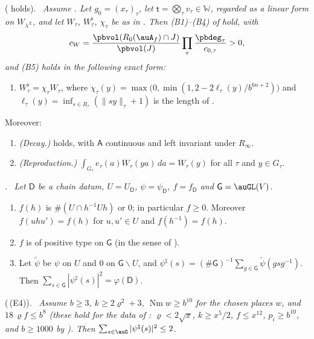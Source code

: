 \documentclass[10pt]{amsart}
\theoremstyle{definition}
\theoremstyle{remark}
\providecommand{\auNm}{\operatorname{Nm}}
\providecommand{\pbW}{\mathbb W}
\providecommand{\pbel}{\ell}
\providecommand{\pbmD}{\mathsf D}
\providecommand{\pbmPhi}{\varphi}
\providecommand{\pbnat}{\natural}
\newenvironment{quotedthm}[2]{\par\medskip\noindent\begingroup
  \textbf{#1}#2.\ \itshape\ignorespaces}{\endgroup\par\medskip}
\begin{document}
\begin{quotedthm}{\cite[Theorem~3.22]{P51}}{ ({\cite[Hypothesis~2.16]{P51}} holds)}
Assume {\cite[Theorem~3.16]{P51}}. Let $g_0=(x_\tau)_\tau$, let $\mathsf t=\bigotimes_\tau v_\tau\in\pbW$,
regarded as a linear form on $W_{\lambda^X}$, and let $W_\tau$, $W_\tau^\flat$, $\chi_\tau$ be as in
{\cite[Proposition~3.18]{P51}}. Then \textup{(B1)--(B4)} of {\cite[Definition~2.16]{P51}} hold, with
\[
c_W=\frac{\pbvol(R_0(\auA_f)\cap J)}{\pbvol(J)}\prod_\tau\frac{\pbdeg_\tau}{c_{0,\tau}}>0,
\]
and \textup{(B5)} holds in the following exact form:
\begin{enumerate}
\item[(B5)] $W_\tau^\flat=\chi_\tau W_\tau$, where $\chi_\tau(y)=\max\bigl(0,\min(1,2-2\pbel_\tau(y)/
b^{6n+2})\bigr)$ and $\pbel_\tau(y)=\inf_{s\in R_\tau}(\|sy\|_\tau+1)$ is the length of
{\cite[Definition~3.14]{P51}}.
\end{enumerate}
Moreover:
\begin{enumerate}
\item[(B6)] \emph{(Decay.)} {\cite[(25)]{P51}} holds, with $\mathsf A$ continuous and left
invariant under $R_\infty$.
\item[(B7)] \emph{(Reproduction.)} $\int_{G_\tau}e_\tau(a)W_\tau(ya)\,da=W_\tau(y)$ for all $\tau$
and $y\in G_\tau$.
\end{enumerate}
\end{quotedthm}

\begin{quotedthm}{\cite[Lemma~3.33]{P51}}{}
Let $\pbmD$ be a chain datum, $U=U_\pbmD$, $\psi=\psi_\pbmD$, $f=f_\pbmD$ and $\mathsf G=\auGL(V)$.
\begin{enumerate}
\item[(a)] $f(h)$ is $\#(U\cap h^{-1}Uh)$ or $0$; in particular $f\ge0$. Moreover $f(uhu')=f(h)$
for $u,u'\in U$ and $f(h^{-1})=f(h)$.
\item[(b)] $f$ is of positive type on $\mathsf G$ (in the sense of {\cite[\S2.3]{P51}}).
\item[(c)] Let $\tilde\psi$ be $\psi$ on $U$ and $0$ on $\mathsf G\smallsetminus U$, and
$\psi^{\pbnat}(s)=(\#\mathsf G)^{-1}\sum_{g\in\mathsf G}\tilde\psi(gsg^{-1})$. Then
$\sum_{s\in\mathsf G}|\psi^{\pbnat}(s)|^2=\pbmPhi(\pbmD)$.
\end{enumerate}
\end{quotedthm}

\begin{quotedthm}{\cite[Theorem~3.39]{P51}}{ ({\cite[Theorem~2.4]{P51}}\,\textup{(E4)})}
Assume $b\ge3$, $k\ge2\varrho^2+3$, $\auNm w\ge b^{10}$ for the chosen places $w$, and $18\,\varrho f\le b^8$
(these hold for the data of {\cite[\S2.1]{P51}}: $\varrho<2\sqrt x$, $k\ge x^5/2$, $f\le x^{12}$, $p_i\ge b^{10}$, and $b\ge1000$ by {\cite[Lemma~13.4(S1)]{P46}}). Then
$\sum_{s\in\auG}|\psi^{\pbnat}(s)|^2\le2$.
\end{quotedthm}
\end{document}
